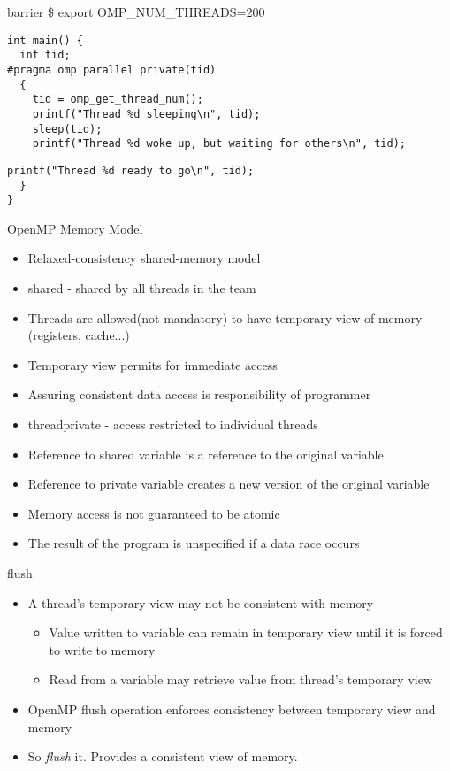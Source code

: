 \documentclass[10pt]{beamer}
\begin{document}
\begin{frame}[fragile]{barrier}
\$ export OMP\_NUM\_THREADS=200
\begin{Verbatim}[fontsize=\small, formatcom=\color{red}]
int main() {
  int tid;
#pragma omp parallel private(tid)
  {
    tid = omp_get_thread_num();
    printf("Thread %d sleeping\n", tid);
    sleep(tid);
    printf("Thread %d woke up, but waiting for others\n", tid);
\end{Verbatim}
\begin{Verbatim}[fontsize=\small, formatcom=\color{red}]
    printf("Thread %d ready to go\n", tid);
  }
}
\end{Verbatim}
\end{frame}

\begin{frame}{OpenMP Memory Model}
\begin{itemize}
\item Relaxed-consistency shared-memory model
\item shared - shared by all threads in the team
\item Threads are allowed(not mandatory) to have temporary view of memory
(registers, cache...)
\item Temporary view permits for immediate access
\item Assuring consistent data access is responsibility of programmer
\item threadprivate - access restricted to individual threads
\item Reference to shared variable is a reference to the original variable
\item Reference to private variable creates a new version of the original
variable
\item Memory access is not guaranteed to be atomic
\item The result of the program is unspecified if a data race occurs
\end{itemize}
\end{frame}

\begin{frame}{flush}
\begin{itemize}
\item A thread's temporary view may not be consistent with memory
\begin{itemize}
  \item Value written to variable can remain in temporary view until it is
        forced to write to memory
  \item Read from a variable may retrieve value from thread's temporary view
\end{itemize}
\item OpenMP flush operation enforces consistency between temporary view and
memory
\item So \emph{flush} it. Provides a consistent view of memory.
\end{itemize}
\end{frame}
\end{document}
